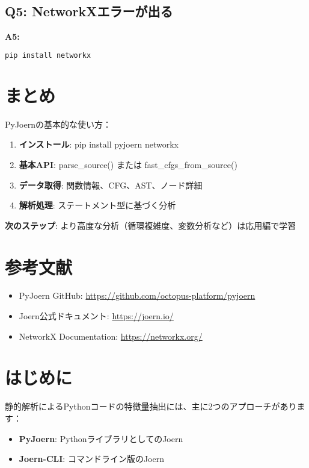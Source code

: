 \documentclass[12pt,a4paper]{article}
\begin{document}
\subsection{Q5: NetworkXエラーが出る}

\textbf{A5:}
\begin{lstlisting}[language=bash]
pip install networkx
\end{lstlisting}

\section{まとめ}

PyJoernの基本的な使い方：

\begin{enumerate}
    \item \textbf{インストール}: pip install pyjoern networkx
    \item \textbf{基本API}: parse\_source() または fast\_cfgs\_from\_source()
    \item \textbf{データ取得}: 関数情報、CFG、AST、ノード詳細
    \item \textbf{解析処理}: ステートメント型に基づく分析
\end{enumerate}

\textbf{次のステップ}: より高度な分析（循環複雑度、変数分析など）は応用編で学習

\section{参考文献}

\begin{itemize}
    \item PyJoern GitHub: \url{https://github.com/octopus-platform/pyjoern}
    \item Joern公式ドキュメント: \url{https://joern.io/}
    \item NetworkX Documentation: \url{https://networkx.org/}
\end{itemize}


\section{はじめに}

静的解析によるPythonコードの特徴量抽出には、主に2つのアプローチがあります：
\begin{itemize}
    \item \textbf{PyJoern}: PythonライブラリとしてのJoern
    \item \textbf{Joern-CLI}: コマンドライン版のJoern
\end{itemize}
\end{document}
